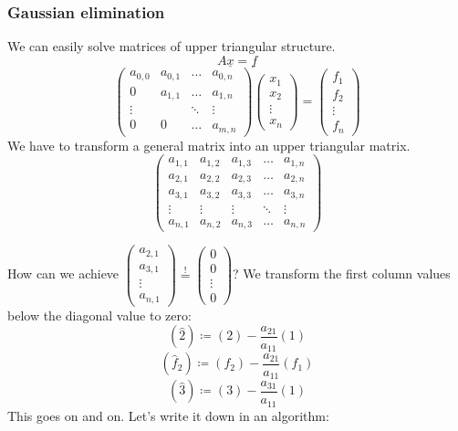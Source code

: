 \documentclass{article}
\begin{document}
\subsubsection{Gaussian elimination}
%
We can easily solve matrices of upper triangular structure.
\[ A \underline{x} = \underline{f} \]
\[
   \begin{pmatrix} a_{0,0} & a_{0,1} & \ldots & a_{0,n} \\ 0 & a_{1,1} & \ldots & a_{1,n} \\ \vdots &  & \ddots & \vdots \\ 0 & 0 & \ldots & a_{m,n} \end{pmatrix}
   \begin{pmatrix} x_1 \\ x_2 \\ \vdots \\ x_n \end{pmatrix} = \begin{pmatrix} f_1 \\ f_2 \\ \vdots \\ f_n \end{pmatrix}
\]
We have to transform a general matrix into an upper triangular matrix.
\[
  \begin{pmatrix}
    a_{1,1} & a_{1,2} & a_{1,3} & \ldots & a_{1,n} \\
    a_{2,1} & a_{2,2} & a_{2,3} & \ldots & a_{2,n} \\
    a_{3,1} & a_{3,2} & a_{3,3} & \ldots & a_{3,n} \\
    \vdots  & \vdots  & \vdots  & \ddots & \vdots \\
    a_{n,1} & a_{n,2} & a_{n,3} & \ldots & a_{n,n}
  \end{pmatrix}
\]

How can we achieve $\begin{pmatrix} a_{2,1} \\ a_{3,1} \\ \vdots \\ a_{n,1} \end{pmatrix} \stackrel{!}{=} \begin{pmatrix} 0 \\ 0 \\ \vdots \\ 0 \end{pmatrix}$?
We transform the first column values below the diagonal value to zero:
\[ (\hat 2) \coloneqq (2) - \frac{a_{21}}{a_{11}} (1) \]
\[ (\hat f_2) \coloneqq (f_2) - \frac{a_{21}}{a_{11}} (f_1) \]
\[ (\hat 3) \coloneqq (3) - \frac{a_{31}}{a_{11}} (1) \]
This goes on and on. Let's write it down in an algorithm:
\end{document}
